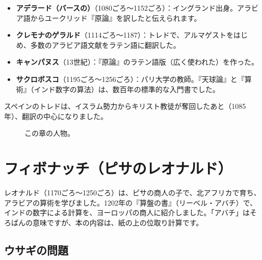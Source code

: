 \documentclass[a4paper,11pt,openany]{ltjsbook}
\begin{document}
\begin{itemize}[leftmargin=*]
\item \textbf{アデラード（バースの）}（1080ごろ〜1152ごろ）：イングランド出身。アラビア語からユークリッド『原論』を訳したと伝えられます。
\item \textbf{クレモナのゲラルド}（1114ごろ〜1187）：トレドで、アルマゲストをはじめ、多数のアラビア語文献をラテン語に翻訳した。
\item \textbf{キャンパヌス}（13世紀）：『原論』のラテン語版（広く使われた）を作った。
\item \textbf{サクロボスコ}（1195ごろ〜1256ごろ）：パリ大学の教師。『天球論』と『算術』（インド数字の算法）は、数百年の標準的な入門書でした。
\end{itemize}

スペインのトレドは、イスラム勢力からキリスト教徒が奪回したあと（1085年）、翻訳の中心になりました。

\begin{figure}[htbp]
\centering
{}
\caption{この章の人物。}
\end{figure}

\section{フィボナッチ（ピサのレオナルド）}

レオナルド（1170ごろ〜1250ごろ）は、ピサの商人の子で、北アフリカで育ち、アラビアの算術を学びました。1202年の『算盤の書』（リーベル・アバチ）で、インドの数字による計算を、ヨーロッパの商人に紹介しました。「アバチ」はそろばんの意味ですが、本の内容は、紙の上の位取り計算です。

\subsection{ウサギの問題}
\end{document}
